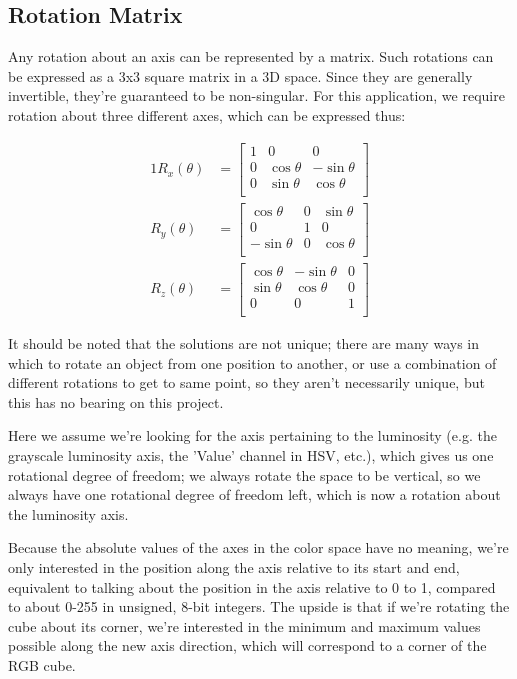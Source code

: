 \documentclass[10pt,a4paper]{article}
\begin{document}
\subsection{Rotation Matrix}\label{sec:RotationMatrix}

Any rotation about an axis can be represented by a matrix. Such rotations can be expressed as a 3x3 square matrix in a 3D space. Since they are generally invertible, they're guaranteed to be non-singular. For this application, we require rotation about three different axes, which can be expressed thus:


\begin{alignat}{1}
R_x(\theta) &= \begin{bmatrix}
1 & 0 & 0 \\
0 & \cos \theta &  -\sin \theta \\[3pt]
0 & \sin \theta  &  \cos \theta \\[3pt]
\end{bmatrix} \\[6pt]
R_y(\theta) &= \begin{bmatrix}
\cos \theta & 0 & \sin \theta \\[3pt]
0 & 1 & 0 \\[3pt]
-\sin \theta & 0 & \cos \theta \\
\end{bmatrix} \\[6pt]
R_z(\theta) &= \begin{bmatrix}
\cos \theta &  -\sin \theta & 0 \\[3pt]
\sin \theta & \cos \theta & 0\\[3pt]
0 & 0 & 1\\
\end{bmatrix}
\end{alignat}


It should be noted that the solutions are not unique; there are many ways in which to rotate an object from one position to another, or use a combination of different rotations to get to same point, so they aren't necessarily unique, but this has no bearing on this project.

Here we assume we're looking for the axis pertaining to the luminosity (e.g. the grayscale luminosity axis, the 'Value' channel in HSV, etc.), which gives us one rotational degree of freedom; we always rotate the space to be vertical, so we always have one rotational degree of freedom left, which is now a rotation about the luminosity axis.

Because the absolute values of the axes in the color space have no meaning, we're only interested in the position along the axis relative to its start and end, equivalent to talking about the position in the axis relative to 0 to 1, compared to about 0-255 in unsigned, 8-bit integers. The upside is that if we're rotating the cube about its corner, we're interested in the minimum and maximum values possible along the new axis direction, which will correspond to a corner of the RGB cube.
\end{document}
